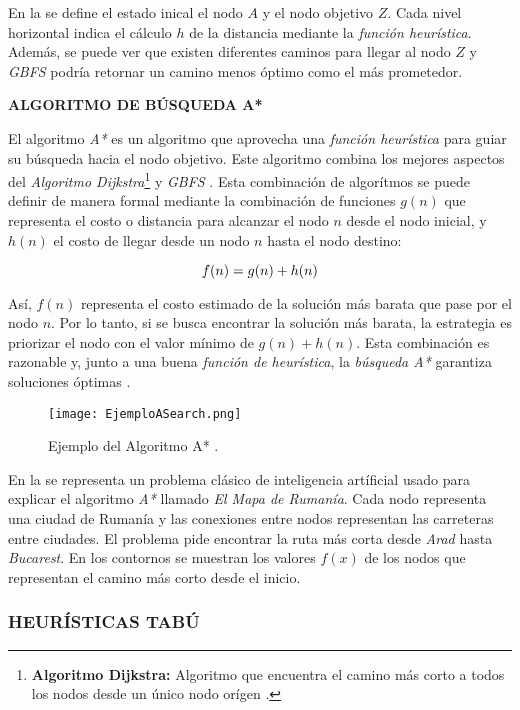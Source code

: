 En la  se define el estado inical el nodo $A$ y el nodo objetivo $Z$. Cada nivel horizontal indica el cálculo $h$ de la distancia mediante la \textit{función heurística}. Además, se puede ver que existen diferentes caminos para llegar al nodo $Z$ y \textit{GBFS} podría retornar un camino menos óptimo como el más prometedor.

\textbf{ALGORITMO DE BÚSQUEDA A*}

El algoritmo \textit{A*} es un algoritmo que aprovecha una \textit{función heurística} para guiar su búsqueda hacia el nodo objetivo. Este algoritmo combina los mejores aspectos del \textit{Algoritmo Dijkstra}\footnote{\textbf{Algoritmo Dijkstra:} Algoritmo que encuentra el camino más corto a todos los nodos desde un único nodo orígen \parencite{javaid2013understanding}.} y \textit{GBFS} \parencite{KumarRAStar}. Esta combinación de algorítmos se puede definir de manera formal mediante la combinación de funciones $g(n)$ que representa el costo o distancia para alcanzar el nodo $n$ desde el nodo inicial, y $h(n)$ el costo de llegar desde un nodo $n$ hasta el nodo destino:

\begin{equation}
    f(n) = g(n) + h(n)
    \addequation{Definición de la función de A*}
\end{equation}

Así, $f(n)$ representa el costo estimado de la solución más barata que pase por el nodo $n$. Por lo tanto, si se busca encontrar la solución más barata, la estrategia es priorizar el nodo con el valor mínimo de $g(n) + h(n)$. Esta combinación es razonable y, junto a una buena \textit{función de heurística}, la \textit{búsqueda A*} garantiza soluciones óptimas \parencite{RusselArtificialIntelligence}. 

\begin{figure}[h!]
    \centering
    \texttt{[image: EjemploASearch.png]}
    \caption{Ejemplo del Algoritmo A* \parencite{RusselArtificialIntelligence}.}
    \label{fig:EjemploAStar}
\end{figure}

\newpage

En la  se representa un problema clásico de inteligencia artíficial usado para explicar el algoritmo \textit{A*} llamado \textit{El Mapa de Rumanía}. Cada nodo representa una ciudad de Rumanía y las conexiones entre nodos representan las carreteras entre ciudades. El problema pide encontrar la ruta más corta desde \textit{Arad} hasta \textit{Bucarest}. En los contornos se muestran los valores $f(x)$ de los nodos que representan el camino más corto desde el inicio.

\subsubsection{HEURÍSTICAS TABÚ}




